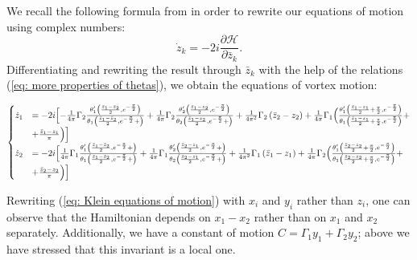 \documentclass[11pt,twoside]{article}
\theoremstyle{definition}
\numberwithin{equation}{section}
\begin{document}
We recall the following formula from \cite{montaldi2003vortex} in order to rewrite our equations of motion using complex numbers:
\[
\dot{z}_k = -2i\frac{\partial\mathcal{H}}{\partial \bar{z}_k}.
\]
Differentiating and rewriting the result through $\bar{z}_k$ with the help of the relations (\ref{eq: more properties of thetas}), we obtain the equations of vortex motion:
\begin{footnotesize}
\begin{equation}
    \label{eq: Klein equations of motion}
    \begin{cases}
    \dot{z}_1 &=-2i\Bigl[-\frac{1}{4\pi}\Gamma_2\frac{\theta'_1\left(\frac{\bar{z}_1 - \bar{z}_2}{2},e^{-\frac{\pi}{2}}  \right)}{\theta_1\left(\frac{\bar{z}_1 - \bar{z}_2}{2},e^{-\frac{\pi}{2}} + \right)}  +\frac{1}{4\pi}\Gamma_2\frac{\theta'_2\left(\frac{\bar{z}_1 - z_2}{2},e^{-\frac{\pi}{2}} \right)}{\theta_2\left(\frac{\bar{z}_1 - z_2}{2},e^{-\frac{\pi}{2}} + \right)} + \frac{1}{4\pi^2}\Gamma_2\left(\bar{z}_2-z_2\right) + \frac{1}{4\pi}\Gamma_1\Bigl(\frac{\theta_1'\left(\frac{\bar{z}_1-z_1}{2} + \frac{\pi}{2}, e^{-\frac{\pi}{2}}\right)}{\theta_1\left(\frac{\bar{z}_1-z_1}{2} + \frac{\pi}{2}, e^{-\frac{\pi}{2}}\right)} +\\&+ \frac{\bar{z}_1-z_1}{\pi}\Bigr)\Bigr]\\
    \dot{z}_2 &=-2i\Bigl[\frac{1}{4\pi}\Gamma_1\frac{\theta'_1\left(\frac{\bar{z}_1 - \bar{z}_2}{2},e^{-\frac{\pi}{2}} + \right)}{\theta_1\left(\frac{\bar{z}_1 - \bar{z}_2}{2},e^{-\frac{\pi}{2}} + \right)}  +\frac{1}{4\pi}\Gamma_1\frac{\theta'_2\left(\frac{\bar{z}_2 - z_1}{2},e^{-\frac{\pi}{2}} + \right)}{\theta_2\left(\frac{\bar{z}_2 - z_1}{2},e^{-\frac{\pi}{2}} + \right)} + \frac{1}{4\pi^2}\Gamma_1\left(\bar{z}_1-z_1
    \right) + \frac{1}{4\pi}\Gamma_2\Bigl(\frac{\theta_1'\left(\frac{\bar{z}_2-z_2}{2} + \frac{\pi}{2}, e^{-\frac{\pi}{2}}\right)}{\theta_1\left(\frac{\bar{z}_2-z_2}{2} + \frac{\pi}{2}, e^{-\frac{\pi}{2}}\right)} +\\&+ \frac{\bar{z}_2-z_2}{\pi}\Bigr)\Bigr]
    \end{cases}
\end{equation}
\end{footnotesize}
Rewriting (\ref{eq: Klein equations of motion}) with $x_i$ and $y_i$ rather than $z_i$, one can observe that the Hamiltonian depends on $x_1-x_2$ rather than on $x_1$ and $x_2$ separately. Additionally, we have a constant of motion $C = \Gamma_1y_1 + \Gamma_2y_2$; above we have stressed that this invariant is a local one. 
\end{document}
